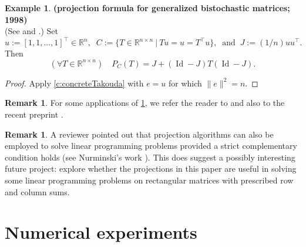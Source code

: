 \documentclass[12pt]{article}
\newcommand{\menge}[2]{\big\{{#1}~\big |~{#2}\big\}}
\newcommand{\RR}{\ensuremath{\mathbb R}}
\newcommand{\Id}{\ensuremath{\operatorname{Id}}}
\theoremstyle{definition}
\newtheorem{example}[theorem]{Example}
\newtheorem{remark}[theorem]{Remark}
\providecommand{\RR}{\mathbb{R}}
\providecommand{\Id}{\operatorname{{ Id}}}
\providecommand{\Id}{\operatorname{Id}}
\providecommand{\RR}{\mathbb{R}}
\begin{document}
{\begin{example}\textbf{(projection formula for 
generalized bistochastic matrices; 1998)}\\ 
(See \cite[Theorem on page~566]{Khoury} and 
\cite[Corollary~2.1]{Gluntetal1}.)
\label{ex:Takouda}
Set 
\begin{equation}
u:=[1,1,\ldots,1]^\intercal\in \RR^n,\;\;
C := \menge{T\in\RR^{n\times n}}{Tu=u=T^\intercal u}, 
\;\;\text{and}\;\;
J:=(1/n)uu^\intercal. 
\end{equation}
Then 
\begin{equation}
(\forall T\in\RR^{n\times n})\quad 
P_C(T)=J+(\Id-J)T(\Id-J). 
\end{equation}
\end{example}
\begin{proof}
Apply \cref{c:concreteTakouda} with $e=u$
for which  $\|e\|^2=n$. 
\end{proof}

\begin{remark} 
For some applications of \cref{ex:Takouda}, we 
refer the reader to \cite{Takouda05} and also
to the recent preprint 
\cite{ACT}.
\end{remark}

{ 
\begin{remark} 
A reviewer pointed out that projection algorithms
can also be employed to solve linear programming problems 
provided a strict complementary condition holds 
(see Nurminski's work \cite{Nurminski}). 
This does suggest a possibly interesting future project: explore 
whether the projections in this paper are useful in 
solving some linear programming problems on rectangular matrices
with prescribed row and column sums. 
\end{remark}
}

\section{Numerical experiments}

\label{sec:numerics}

}
\end{document}
